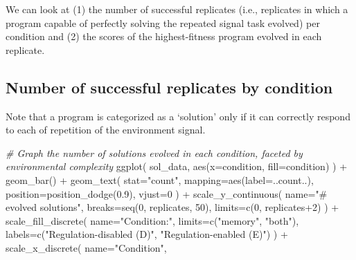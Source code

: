 \documentclass[
]{book}
\newenvironment{Shaded}{\begin{snugshade}}{\end{snugshade}}
\newcommand{\AttributeTok}[1]{\textcolor[rgb]{0.77,0.63,0.00}{#1}}
\newcommand{\CommentTok}[1]{\textcolor[rgb]{0.56,0.35,0.01}{\textit{#1}}}
\newcommand{\DecValTok}[1]{\textcolor[rgb]{0.00,0.00,0.81}{#1}}
\newcommand{\FloatTok}[1]{\textcolor[rgb]{0.00,0.00,0.81}{#1}}
\newcommand{\FunctionTok}[1]{\textcolor[rgb]{0.00,0.00,0.00}{#1}}
\newcommand{\NormalTok}[1]{#1}
\newcommand{\SpecialCharTok}[1]{\textcolor[rgb]{0.00,0.00,0.00}{#1}}
\newcommand{\StringTok}[1]{\textcolor[rgb]{0.31,0.60,0.02}{#1}}
\begin{document}
We can look at
(1) the number of successful replicates (i.e., replicates in which a program capable of perfectly solving the repeated signal task evolved) per condition
and (2) the scores of the highest-fitness program evolved in each replicate.

\hypertarget{number-of-successful-replicates-by-condition}{%
\subsection{Number of successful replicates by condition}\label{number-of-successful-replicates-by-condition}}

Note that a program is categorized as a `solution' only if it can correctly respond to each of repetition of the environment signal.

\begin{Shaded}
\begin{Highlighting}[]
\CommentTok{\# Graph the number of solutions evolved in each condition, faceted by environmental complexity}
\FunctionTok{ggplot}\NormalTok{( sol\_data, }\FunctionTok{aes}\NormalTok{(}\AttributeTok{x=}\NormalTok{condition, }\AttributeTok{fill=}\NormalTok{condition) ) }\SpecialCharTok{+}
  \FunctionTok{geom\_bar}\NormalTok{() }\SpecialCharTok{+}
  \FunctionTok{geom\_text}\NormalTok{(}
    \AttributeTok{stat=}\StringTok{"count"}\NormalTok{,}
    \AttributeTok{mapping=}\FunctionTok{aes}\NormalTok{(}\AttributeTok{label=}\NormalTok{..count..),}
    \AttributeTok{position=}\FunctionTok{position\_dodge}\NormalTok{(}\FloatTok{0.9}\NormalTok{),}
    \AttributeTok{vjust=}\DecValTok{0}
\NormalTok{  ) }\SpecialCharTok{+}
  \FunctionTok{scale\_y\_continuous}\NormalTok{(}
    \AttributeTok{name=}\StringTok{"\# evolved solutions"}\NormalTok{,}
    \AttributeTok{breaks=}\FunctionTok{seq}\NormalTok{(}\DecValTok{0}\NormalTok{, replicates, }\DecValTok{50}\NormalTok{),}
    \AttributeTok{limits=}\FunctionTok{c}\NormalTok{(}\DecValTok{0}\NormalTok{, replicates}\SpecialCharTok{+}\DecValTok{2}\NormalTok{)}
\NormalTok{  ) }\SpecialCharTok{+}
  \FunctionTok{scale\_fill\_discrete}\NormalTok{(}
    \AttributeTok{name=}\StringTok{"Condition:"}\NormalTok{,}
    \AttributeTok{limits=}\FunctionTok{c}\NormalTok{(}\StringTok{"memory"}\NormalTok{, }\StringTok{"both"}\NormalTok{),}
    \AttributeTok{labels=}\FunctionTok{c}\NormalTok{(}\StringTok{"Regulation{-}disabled (D)"}\NormalTok{, }\StringTok{"Regulation{-}enabled (E)"}\NormalTok{)}
\NormalTok{  ) }\SpecialCharTok{+}
  \FunctionTok{scale\_x\_discrete}\NormalTok{(}
    \AttributeTok{name=}\StringTok{"Condition"}\NormalTok{,}

\end{Highlighting}
\end{Shaded}
\end{document}
